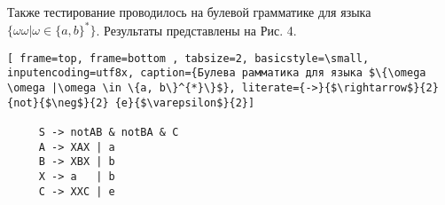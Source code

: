 \documentclass[14pt]{matmex-diploma}
\begin{document}
Также тестирование проводилось на булевой грамматике для языка  $\{\omega \omega |\omega \in \{a, b\}^{*}\}$. Результаты представлены на Рис. 4. 

\begin{lstlisting}[ frame=top, frame=bottom , tabsize=2, basicstyle=\small, inputencoding=utf8x, caption={Булева рамматика для языка $\{\omega \omega |\omega \in \{a, b\}^{*}\}$}, literate={->}{$\rightarrow$}{2} {not}{$\neg$}{2} {e}{$\varepsilon$}{2}]

     S -> notAB & notBA & C 
     A -> XAX | a 
     B -> XBX | b  
     X -> a   | b
     C -> XXC | e  
       
\end{lstlisting}

\end{document}
